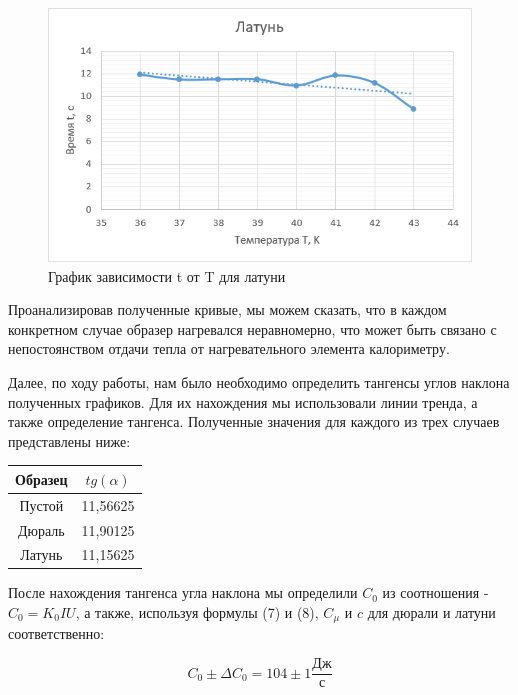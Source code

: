 \documentclass[a4paper,12pt]{article}
\begin{document}
\newpage
\begin{figure}[h!]
	\begin{center}
		\includegraphics[scale=1]{3}
	\end{center}
	\caption{График зависимости t от T для латуни}
	
\end{figure}
\hspace{\parindent}Проанализировав полученные кривые, мы можем сказать, что в каждом конкретном случае образер нагревался неравномерно, что может быть связано с непостоянством отдачи тепла от нагревательного элемента калориметру.

Далее, по ходу работы, нам было необходимо определить тангенсы углов наклона полученных графиков. Для их нахождения мы использовали линии тренда, а также определение тангенса. Полученные значения для каждого из трех случаев представлены ниже:

\begin{center}
	\begin{tabular}{|c|c|}
		\hline
		Образец&	$tg(\alpha)$
		\\
		\hline
		Пустой&	11,56625
		\\
		Дюраль&	11,90125
		\\
		Латунь&	11,15625
		\\
		\hline		
	\end{tabular}

\end{center}

\newpage
\hspace{\parindent}После нахождения тангенса угла наклона мы определили $C_0$ из соотношения - $C_0 = K_0IU$, а также, используя формулы (7) и (8), $C_\mu$ и $c$ для дюрали и латуни соответственно:

$$C_0\pm\Delta C_0 = 104\pm1\frac{Дж}{с}$$
\end{document}
